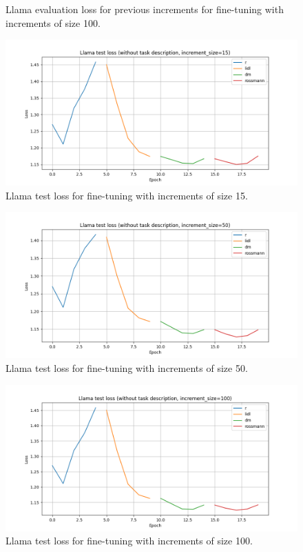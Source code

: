 \documentclass[licencjacka,en]{pracamgr}
\begin{document}
\begin{appendices}
\begin{figure}[h]
    \caption{Llama evaluation loss for previous increments for fine-tuning with increments of size 100.}
    \label{fig:llama-inc-100-eval}
\end{figure}
\begin{figure}[h]
    \centering
    \includegraphics[width=0.8\linewidth]{bachelor_images/llama_ft/llama-inc-15-test.png}
    \caption{Llama test loss for fine-tuning with increments of size 15.}
    \label{fig:llama-inc-15-test}
\end{figure}
\begin{figure}[h]
    \centering
    \includegraphics[width=0.8\linewidth]{bachelor_images/llama_ft/llama-inc-50-test.png}
    \caption{Llama test loss for fine-tuning with increments of size 50.}
    \label{fig:llama-inc-50-test}
\end{figure}
\begin{figure}[h]
    \centering
    \includegraphics[width=0.8\linewidth]{bachelor_images/llama_ft/llama-inc-100-test.png}
    \caption{Llama test loss for fine-tuning with increments of size 100.}
    \label{fig:llama-inc-100-test}
\end{figure}


\end{appendices}
\end{document}
